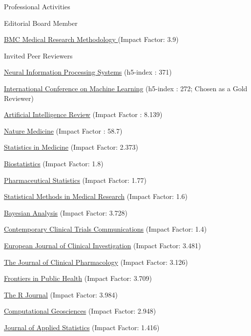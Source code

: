 \documentclass[
	11pt, %
]{resume} %
\begin{document}
\begin{rSection}{Professional Activities}
\begin{rSubsection}{
		Editorial Board Member}{}{}{}
	\item \href{https://link.springer.com/journal/12874/editorial-board}{BMC Medical Research Methodology } (Impact Factor: 3.9)	
\end{rSubsection}
\begin{rSubsection}{
Invited Peer Reviewers}{}{}{}
\item \href{https://neurips.cc/}{Neural Information Processing Systems} (h5-index : 371)
\item \href{https://icml.cc/}{International Conference on Machine Learning} (h5-index : 272; Chosen as a Gold Reviewer)
\item \href{https://link.springer.com/journal/10462}{Artificial Intelligence Review} (Impact Factor : 8.139)
\item \href{https://www.nature.com/nm/}{Nature Medicine} (Impact Factor : 58.7)
\item \href{https://onlinelibrary.wiley.com/journal/10970258}{Statistics in Medicine} (Impact Factor: 2.373)
\item \href{https://academic.oup.com/biostatistics}{Biostatistics} (Impact Factor: 1.8)
\item \href{https://onlinelibrary.wiley.com/journal/15391612}{Pharmaceutical Statistics} (Impact Factor: 1.77)
\item \href{https://journals.sagepub.com/home/smm}{Statistical Methods in Medical Research} (Impact Factor: 1.6)
\item \href{https://projecteuclid.org/journals/bayesian-analysis}{Bayesian Analysis} (Impact Factor: 3.728)
\item \href{https://www.sciencedirect.com/journal/contemporary-clinical-trials-communications}{Contemporary Clinical Trials Communications} (Impact Factor: 1.4)
\item \href{https://onlinelibrary.wiley.com/journal/13652362}{European Journal of Clinical Investigation} (Impact Factor: 3.481)
\item \href{https://accp1.onlinelibrary.wiley.com/journal/15524604}{The Journal of Clinical Pharmacology} (Impact Factor: 3.126)
\item \href{https://www.frontiersin.org/journals/public-health}{Frontiers in Public Health} (Impact Factor: 3.709)
\item \href{https://journal.r-project.org/}{The R Journal} (Impact Factor: 3.984)
\item \href{https://www.springer.com/journal/10596}{Computational Geosciences} (Impact Factor: 2.948)
\item \href{https://www.tandfonline.com/journals/cjas20}{Journal of Applied Statistics} (Impact Factor: 1.416)
\end{rSubsection}
\end{rSection}
\end{document}
